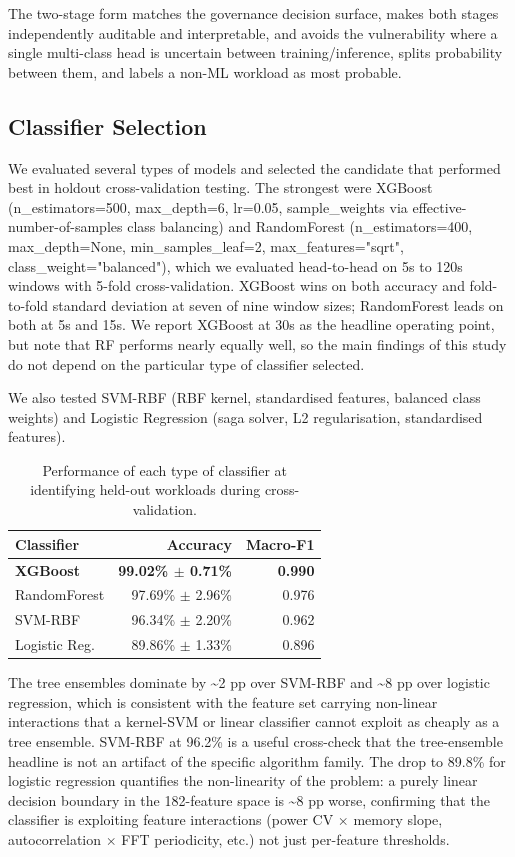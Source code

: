The two-stage form matches the governance decision surface, makes both stages independently auditable and interpretable, and avoids the vulnerability where a single multi-class head is uncertain between training/inference, splits probability between them, and labels a non-ML workload as most probable.

\subsection{Classifier Selection}
\label{sec:clfsel}

We evaluated several types of models and selected the candidate that performed best in holdout cross-validation testing. The strongest were XGBoost (n\_estimators=500, max\_depth=6, lr=0.05, sample\_weights via effective-number-of-samples class balancing) and RandomForest \citep{breiman2001} (n\_estimators=400, max\_depth=None, min\_samples\_leaf=2, max\_features="sqrt", class\_weight="balanced"), which we evaluated head-to-head on 5s to 120s windows with 5-fold cross-validation. XGBoost wins on both accuracy and fold-to-fold standard deviation at seven of nine window sizes; RandomForest leads on both at 5s and 15s. We report XGBoost at 30s as the headline operating point, but note that RF performs nearly equally well, so the main findings of this study do not depend on the particular type of classifier selected.

We also tested SVM-RBF (RBF kernel, standardised features, balanced class weights) and Logistic Regression (saga solver, L2 regularisation, standardised features).

\begin{table}[htbp]
\centering
\small
\begin{tabular}{lrr}
\toprule
\textbf{Classifier} & \textbf{Accuracy} & \textbf{Macro-F1} \\
\midrule
\textbf{XGBoost} & \textbf{99.02\% $\pm$ 0.71\%} & \textbf{0.990} \\
RandomForest & 97.69\% $\pm$ 2.96\% & 0.976 \\
SVM-RBF & 96.34\% $\pm$ 2.20\% & 0.962 \\
Logistic Reg. & 89.86\% $\pm$ 1.33\% & 0.896 \\
\bottomrule
\end{tabular}
\caption{Performance of each type of classifier at identifying held-out workloads during cross-validation.}
\label{tab:clf}
\end{table}

The tree ensembles dominate by \textasciitilde{}2 pp over SVM-RBF and \textasciitilde{}8 pp over logistic regression, which is consistent with the feature set carrying non-linear interactions that a kernel-SVM or linear classifier cannot exploit as cheaply as a tree ensemble. SVM-RBF at 96.2\% is a useful cross-check that the tree-ensemble headline is not an artifact of the specific algorithm family. The drop to 89.8\% for logistic regression quantifies the non-linearity of the problem: a purely linear decision boundary in the 182-feature space is \textasciitilde{}8 pp worse, confirming that the classifier is exploiting feature interactions (power CV $\times$ memory slope, autocorrelation $\times$ FFT periodicity, etc.) not just per-feature thresholds.

